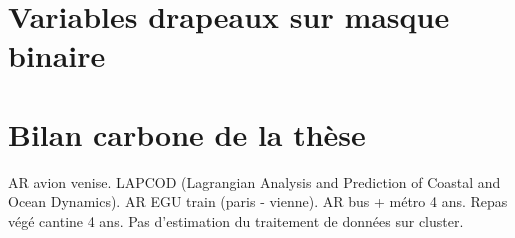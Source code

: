

\section{Variables drapeaux sur masque binaire}
\label{sec:cf-flags}


\section{Bilan carbone de la thèse}
\label{sec:bilan-carbone}

AR avion venise.
LAPCOD (Lagrangian Analysis and Prediction of Coastal and Ocean Dynamics).
AR EGU train (paris - vienne).
AR bus + métro 4 ans.
Repas végé cantine 4 ans.
Pas d'estimation du traitement de données sur cluster.

